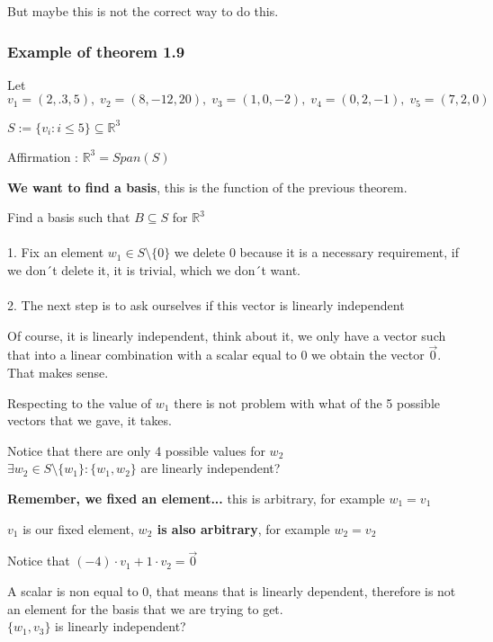 \documentclass{article}
\begin{document}
But maybe this is not the correct way to do this.





\subsubsection*{Example of theorem 1.9}
Let \(v_1 = (2,.3,5),\; v_2=(8,-12,20),\; v_3=(1,0,-2),\; v_4=(0,2,-1),\; v_5=(7,2,0)\)

\(S:=\{v_i : i \leq 5\}\subseteq \mathbb{R}^3\)

Affirmation : \(\mathbb{R}^3 = Span(S)\)

\textbf{We want to find a basis}, this is the function of the previous theorem.

Find a basis such that \(B \subseteq S\) for \(\mathbb{R}^3\)
\\
\\
1. Fix an element \(w_1 \in S\text{\textbackslash}\{0\}\) we delete 0 because it is a necessary requirement, if we don´t delete it, it is trivial, which we don´t want.
\\
\\
2. The next step is to ask ourselves if this vector is linearly independent

Of course, it is linearly independent, think about it, we only have a vector such that into a linear combination with a scalar equal to 0 we obtain the vector \(\vec{0}\). That makes sense.

Respecting to the value of \(w_1\) there is not problem with what of the 5 possible vectors that we gave, it takes.

Notice that there are only 4 possible values for \(w_2\)
\\

\(\exists w_2 \in S\text{\textbackslash} \{w_1\} : \{w_1, w_2\}\) are linearly independent?

\textbf{Remember, we fixed an element... } this is arbitrary, for example \(w_1 = v_1\)

\(v_1\) is our fixed element, \textbf{\(w_2\) is also arbitrary}, for example \(w_2 = v_2\)

Notice that \((-4)\cdot v_1 + 1 \cdot v_2 = \vec{0}\)

A scalar is non equal to 0, that means that is linearly dependent, therefore is not an element for the basis that we are trying to get.
\\

\(\{w_1, v_3\}\) is linearly independent?
\end{document}
